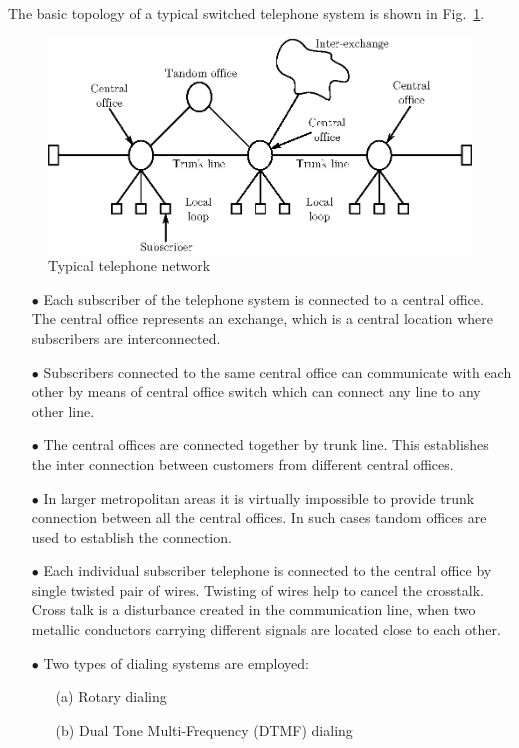 The basic topology of a typical switched telephone system is shown in Fig.~\ref{fig10.1}.
\begin{figure}[H]
\centering
\includegraphics[scale=.94]{chap10/fig10.1.eps}
\caption{Typical telephone network}\label{fig10.1}
\end{figure}
\begin{itemize}
\item[$\bullet$] Each subscriber of the telephone system is connected to a central office. The central office represents an exchange, which is a central location where subscribers are interconnected.

\item[$\bullet$] Subscribers connected to the same central office can communicate with each other by means of central office switch which can connect any line to any other line.

\item[$\bullet$] The central offices are connected together by trunk line. This establishes the inter connection between customers from different central offices.

\item[$\bullet$] In larger metropolitan areas it is virtually impossible to provide trunk connection between all the central offices. In such cases tandom offices are used to establish the connection.

\item[$\bullet$] Each individual subscriber telephone is connected to the central office by single twisted pair of wires. Twisting of wires help to cancel the crosstalk. Cross talk is a disturbance created in the communication line, when two metallic conductors carrying different signals are located close to each other.

\item[$\bullet$] Two types of dialing systems are employed:
\begin{itemize}
\item[(a)] Rotary dialing

\item[(b)] Dual Tone Multi-Frequency (DTMF) dialing
\end{itemize}
\end{itemize}

